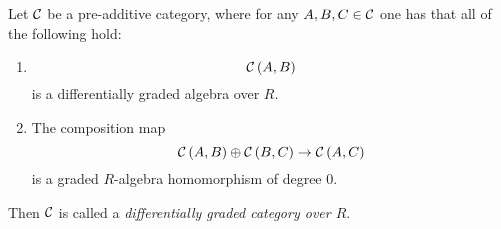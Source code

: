 \begin{definition}
    Let \( {\mathcal{C}} \) be a pre-additive category, where for any \( A, B, C \in {\mathcal{C}} \) one has that all of the following hold:
    \begin{enumerate}
        \item {
            \[
                {\mathcal{C}}\left( A, B \right)
            \]
            is a differentially graded algebra over \( R \).
        }
        \item {
            The composition map
            \[
                {\mathcal{C}}\left( A, B \right) \oplus {\mathcal{C}}\left( B, C \right) \to {\mathcal{C}}\left( A, C \right)
            \]
            is a graded \( R \)-algebra homomorphism of degree \( 0 \).
        }
    \end{enumerate}
    Then \( {\mathcal{C}} \) is called a \emph{differentially graded category over \( R \)}.
\end{definition}
